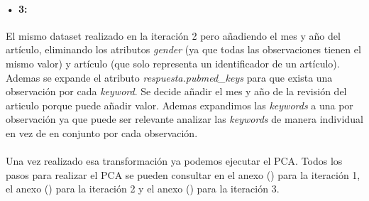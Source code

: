 \paragraph{• 3: } \label{section:pca_case3}El mismo dataset realizado en la iteración 2 pero añadiendo el mes y año del artículo, eliminando los atributos \textit{gender} (ya que todas las observaciones tienen el mismo valor) y artículo (que solo representa un identificador de un artículo). Ademas se expande el atributo \textit{respuesta.pubmed\_keys} para que exista una observación por cada \textit{keyword}. Se decide añadir el mes y año de la revisión del articulo porque puede añadir valor. Ademas expandimos las \textit{keywords} a una por observación ya que puede ser relevante analizar las \textit{keywords} de manera individual en vez de en conjunto por cada observación.

\paragraph{}
Una vez realizado esa transformación ya podemos ejecutar el PCA. Todos los pasos para realizar el PCA se pueden consultar en el anexo () para la iteración 1, el anexo () para la iteración 2 y el anexo () para la iteración 3.